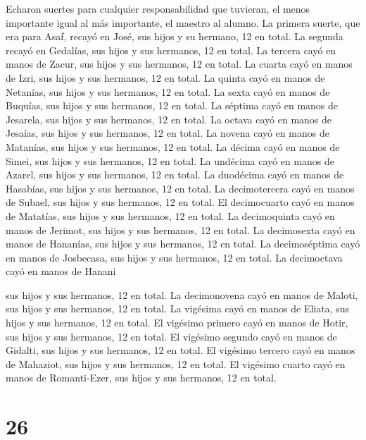  Echaron suertes para cualquier responsabilidad que
tuvieran, el menos importante igual al más importante, el maestro al
alumno.  La primera suerte, que era para Asaf, recayó en
José, sus hijos y su hermano, 12 en total. La segunda recayó en
Gedalías, sus hijos y sus hermanos, 12 en total.  La
tercera cayó en manos de Zacur, sus hijos y sus hermanos, 12 en total.
 La cuarta cayó en manos de Izri, sus hijos y sus hermanos,
12 en total.  La quinta cayó en manos de Netanías, sus
hijos y sus hermanos, 12 en total.  La sexta cayó en manos
de Buquías, sus hijos y sus hermanos, 12 en total.  La
séptima cayó en manos de Jesarela, sus hijos y sus hermanos, 12 en
total.  La octava cayó en manos de Jesaías, sus hijos y sus
hermanos, 12 en total.  La novena cayó en manos de
Matanías, sus hijos y sus hermanos, 12 en total.  La décima
cayó en manos de Simei, sus hijos y sus hermanos, 12 en total.
 La undécima cayó en manos de Azarel, sus hijos y sus
hermanos, 12 en total.  La duodécima cayó en manos de
Hasabías, sus hijos y sus hermanos, 12 en total.  La
decimotercera cayó en manos de Subael, sus hijos y sus hermanos, 12 en
total.  El decimocuarto cayó en manos de Matatías, sus
hijos y sus hermanos, 12 en total.  La decimoquinta cayó en
manos de Jerimot, sus hijos y sus hermanos, 12 en total. 
La decimosexta cayó en manos de Hananías, sus hijos y sus hermanos, 12
en total.  La decimoséptima cayó en manos de Josbecasa, sus
hijos y sus hermanos, 12 en total.  La decimoctava cayó en
manos de Hanani

sus hijos y sus hermanos, 12 en total.  La decimonovena
cayó en manos de Maloti, sus hijos y sus hermanos, 12 en total.
 La vigésima cayó en manos de Eliata, sus hijos y sus
hermanos, 12 en total.  El vigésimo primero cayó en manos
de Hotir, sus hijos y sus hermanos, 12 en total.  El
vigésimo segundo cayó en manos de Gidalti, sus hijos y sus hermanos, 12
en total.  El vigésimo tercero cayó en manos de Mahaziot,
sus hijos y sus hermanos, 12 en total.  El vigésimo cuarto
cayó en manos de Romanti-Ezer, sus hijos y sus hermanos, 12 en total.

\hypertarget{section-25}{%
\section{26}\label{section-25}}

